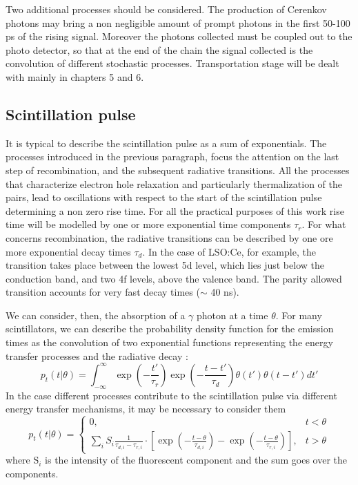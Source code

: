 Two additional processes should be considered. The production of Cerenkov photons may bring a non negligible amount of prompt photons in the first 50-100 ps of the rising signal.
Moreover the photons collected must be coupled out to the photo detector, so that at the end of the chain the signal collected is the convolution of different stochastic processes. Transportation stage will be dealt with mainly in chapters 5 and 6.

\subsection{Scintillation pulse}
It is typical to describe \cite{Hyman1963} the scintillation pulse as a sum of exponentials. The processes introduced in the previous paragraph, focus the attention on the last step of recombination, and the subsequent radiative transitions. 
All the processes that characterize electron hole relaxation and particularly thermalization of the pairs, lead to oscillations with respect to the start of the scintillation pulse determining a non zero rise time.
For all the practical purposes of this work rise time will be modelled by one or more exponential time components $\tau _{r}$. 
For what concerns recombination, the radiative transitions can be described by one ore more exponential decay times $\tau _{d}$.
In the case of LSO:Ce, for example, the transition takes place between the lowest 5d level, which lies just below the conduction band, and two 4f levels, above the valence band. The parity allowed transition accounts for very fast decay times ($\sim$ 40 ns).

We can consider, then, the absorption of a $\gamma$ photon at a time $\theta$. 
For many scintillators, we can describe the probability density function for the emission times as the convolution of two exponential functions representing the energy transfer processes and the radiative decay \cite{Shao2006}:
\begin{equation}
p_{t}(t|\theta) = \int _{-\infty}^{\infty} \exp{\left( -\frac{t'}{\tau _{r}}\right) } \exp{\left(-\frac{t-t'}{\tau _{d}}\right) } \theta (t') \theta (t-t') dt'
\end{equation}
In the case different processes contribute to the scintillation pulse via different energy transfer mechanisms, it may be necessary to consider them \cite{Seifert2012}
\begin{equation}
p _{t}(t|\theta) = \begin{cases} 0, & t < \theta \\ \sum _{i} S_{i} \frac{1}{\tau _{d, i} - \tau _{r, i}} \cdot \left[ \exp{\left( -\frac{t-\theta}{\tau _{d,i}}\right)} - \exp{\left( -\frac{t-\theta}{\tau _{r,i}}\right) } \right], & t > \theta \end{cases}
\end{equation}
where S$_{i}$ is the intensity of the fluorescent component and the sum goes over the components.

